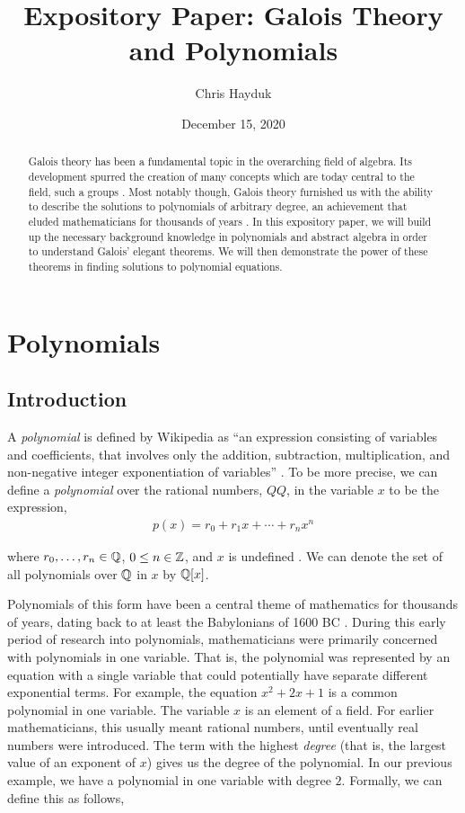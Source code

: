 \documentclass[11pt, a4paper, oneside]{article}
\theoremstyle{plain}
\theoremstyle{plain}
\theoremstyle{plain}
\theoremstyle{plain}
\theoremstyle{definition}
\theoremstyle{example}
\begin{document}
\title{Expository Paper: Galois Theory and Polynomials}
\author{Chris Hayduk}
\date{December 15, 2020}
\maketitle

\begin{abstract}
Galois theory has been a fundamental topic in the overarching field of algebra. Its development spurred the creation of many concepts which are today central to the field, such a groups \cite{jorg, galoiswiki}. Most notably though, Galois theory furnished us with the ability to describe the solutions to polynomials of arbitrary degree, an achievement that eluded mathematicians for thousands of years \cite{jorg}. In this expository paper, we will build up the necessary background knowledge in polynomials and abstract algebra in order to understand Galois' elegant theorems. We will then demonstrate the power of these theorems in finding solutions to polynomial equations.
\end{abstract}

\newpage
\section{Polynomials}

\subsection{Introduction}

A \textit{polynomial} is defined by Wikipedia as ``an expression consisting of variables and coefficients, that involves only the addition, subtraction, multiplication, and non-negative integer exponentiation of variables'' \cite{polynomialwiki}. To be more precise, we can define a \textit{polynomial} over the rational numbers, $QQ$, in the variable $x$ to be the expression,
\begin{align*}
p(x) = r_0 + r_1x + \cdots + r_nx^n
\end{align*} 

where $r_0, \ldots, r_n \in \mathbb{Q}$, $0 \leq n \in \mathbb{Z}$, and $x$ is undefined \cite[\S 2.1, p. 36]{stewart}. We can denote the set of all polynomials over $\mathbb{Q}$ in $x$ by $\mathbb{Q}[x]$.

\par
Polynomials of this form have been a central theme of mathematics for thousands of years, dating back to at least the Babylonians of 1600 BC \cite[p. 2]{stewart}. During this early period of research into polynomials, mathematicians were primarily concerned with polynomials in one variable. That is, the polynomial was represented by an equation with a single variable that could potentially have separate different exponential terms. For example, the equation $x^2 + 2x + 1$ is a common polynomial in one variable. The variable $x$ is an element of a field. For earlier mathematicians, this usually meant rational numbers, until eventually real numbers were introduced. The term with the highest \textit{degree} (that is, the largest value of an exponent of $x$) gives us the degree of the polynomial. In our previous example, we have a polynomial in one variable with degree $2$. Formally, we can define this as follows,
\end{document}
